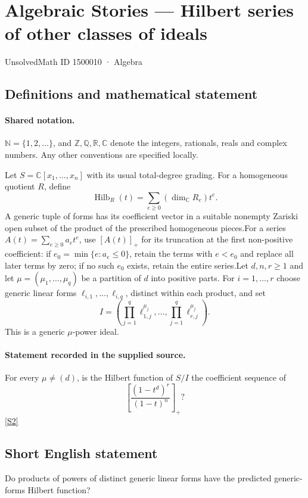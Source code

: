 \documentclass[11pt]{article}
\newcommand{\sref}[2]{\hyperlink{source:#1:#2}{[S#2]}}
\begin{document}
\setcounter{section}{1500009}
\section{Algebraic Stories — Hilbert series of other classes of ideals}\label{1500010}
{\small\sffamily UnsolvedMath ID 1500010 · Algebra}
\subsection{Definitions and mathematical statement}

\paragraph{Shared notation.}$\mathbb N=\{1,2,\ldots\}$, and $\mathbb Z,\mathbb Q,\mathbb R,\mathbb C$ denote the integers, rationals, reals and complex numbers. Any other conventions are specified locally.


Let $S=\mathbb C[x_1,\ldots,x_n]$ with its usual total-degree grading. For a homogeneous quotient $R$, define
\[\operatorname{Hilb}_R(t)=\sum_{e\geq0}(\dim_{\mathbb C}R_e)t^e.
\]
A generic tuple of forms has its coefficient vector in a suitable nonempty Zariski open subset of the product of the prescribed homogeneous pieces.For a series $A(t)=\sum_{e\geq0}a_et^e$, use $[A(t)]_+$ for its truncation at the first non-positive coefficient: if $e_0=\min\{e:a_e\leq0\}$, retain the terms with $e<e_0$ and replace all later terms by zero; if no such $e_0$ exists, retain the entire series.Let $d,n,r\geq1$ and let $\mu=(\mu_1,\ldots,\mu_q)$ be a partition of $d$ into positive parts. For $i=1,\ldots,r$ choose generic linear forms $\ell_{i,1},\ldots,\ell_{i,q}$, distinct within each product, and set
\[I=\left(\prod_{j=1}^q\ell_{1,j}^{\mu_j},\ldots,\prod_{j=1}^q\ell_{r,j}^{\mu_j}\right).
\]
This is a generic $\mu$-power ideal.
\paragraph{Statement recorded in the supplied source.}
For every $\mu\neq(d)$, is the Hilbert function of $S/I$ the coefficient sequence of
\[\left[\frac{(1-t^d)^r}{(1-t)^n}\right]_+?\] \sref{1500010}{2}
\subsection{Short English statement}
Do products of powers of distinct generic linear forms have the predicted generic-forms Hilbert function?
\end{document}
